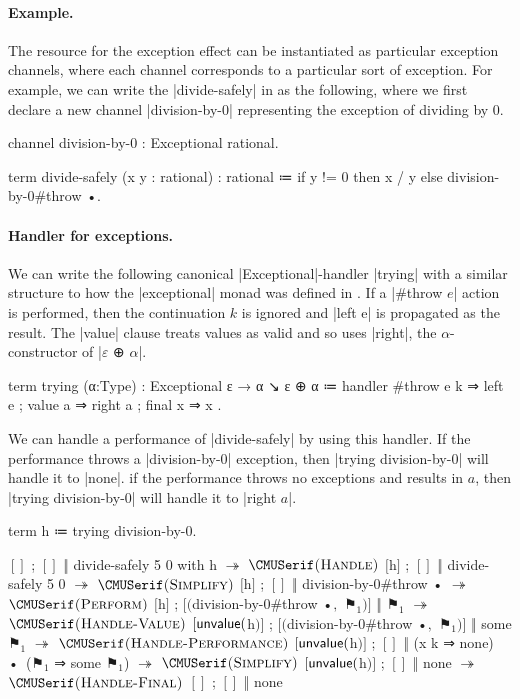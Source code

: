 \paragraph{Example.}
%
The resource for the exception effect can be instantiated as particular exception channels, where each channel corresponds to a particular sort of exception.
For example, we can write the \code|divide-safely| in \LangD as the following, where we first declare a new channel \code|division-by-0| representing the exception of dividing by $0$.
%
\begin{snippet}
channel division-by-0 : Exceptional rational.

term divide-safely (x y : rational) : rational
  ≔ if y != 0
      then x / y
      else division-by-0#throw •.
\end{snippet}

\paragraph{Handler for exceptions.}
%
We can write the following canonical \code|Exceptional|-handler \code|trying| with a similar structure to how the \code|exceptional| monad was defined in \LangC.
If a \code|#throw $e$| action is performed, then the continuation $k$ is ignored and \code|left e| is propagated as the result.
The \code|value| clause treats values as valid and so uses \code|right|, the $α$-constructor of \code|$ε$ ⊕ $α$|.
%
\begin{program}[caption={Handler of exceptions as optionals}]
term trying (α:Type) : Exceptional ε → α ↘ ε ⊕ α
  ≔ handler
      { #throw e k ⇒ left e
      ; value  a   ⇒ right a
      ; final  x   ⇒ x }.
\end{program}
%
We can handle a performance of \code|divide-safely| by using this handler.
If the performance throws a \code|division-by-0| exception, then \code|trying division-by-0| will handle it to \code|none|.
if the performance throws no exceptions and results in $a$, then \code|trying division-by-0| will handle it to \code|right $a$|.
%
\begin{snippet}
term h ≔ trying division-by-0.

$[]$ ; $[]$ ‖ divide-safely 5 0 with h
$↠$ $\ruleapp{Handle}$
$[$h$]$ ; $[]$ ‖ divide-safely 5 0
$↠$ $\ruleapp{Simplify}$
$[$h$]$ ; $[]$ ‖ division-by-0#throw •
$↠$ $\ruleapp{Perform}$
$[$h$]$ ; $[($division-by-0#throw •$,$ $⚑_1$$)]$ ‖ $⚑_1$
$↠$ $\ruleapp{Handle-Value}$
$[\mathsf{unvalue}($h$)]$ ; $[($division-by-0#throw •$,$ $⚑_1$$)]$ ‖ some $⚑_1$
$↠$ $\ruleapp{Handle-Performance}$
$[\mathsf{unvalue}($h$)]$ ; $[]$ ‖ (x k ⇒ none) • ($⚑_1$ ⇒ some $⚑_1$)
$↠$ $\ruleapp{Simplify}$
$[\mathsf{unvalue}($h$)]$ ; $[]$ ‖ none
$↠$ $\ruleapp{Handle-Final}$
$[]$ ; $[]$ ‖ none
\end{snippet}

